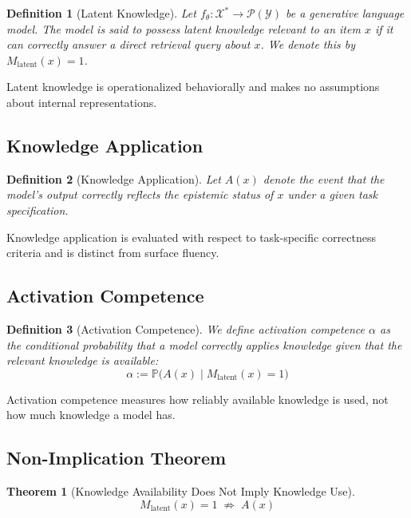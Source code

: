 \documentclass[11pt,a4paper]{article}
\newtheorem{definition}{Definition}[section]
\newtheorem{theorem}{Theorem}[section]
\begin{document}
\begin{definition}[Latent Knowledge]
Let $f_\theta : \mathcal{X}^* \rightarrow \mathcal{P}(\mathcal{Y})$ be a generative language model. The model is said to possess \emph{latent knowledge} relevant to an item $x$ if it can correctly answer a direct retrieval query about $x$. We denote this by $M_{\text{latent}}(x) = 1$.
\end{definition}

Latent knowledge is operationalized behaviorally and makes no assumptions about internal representations.

\subsection{Knowledge Application}

\begin{definition}[Knowledge Application]
Let $A(x)$ denote the event that the model's output correctly reflects the epistemic status of $x$ under a given task specification.
\end{definition}

Knowledge application is evaluated with respect to task-specific correctness criteria and is distinct from surface fluency.

\subsection{Activation Competence}

\begin{definition}[Activation Competence]
We define \emph{activation competence} $\alpha$ as the conditional probability that a model correctly applies knowledge given that the relevant knowledge is available:
\begin{equation}
\boxed{\alpha := \mathbb{P}\big(A(x) \mid M_{\text{latent}}(x) = 1\big)}
\end{equation}
\end{definition}

Activation competence measures how reliably available knowledge is used, not how much knowledge a model has.

\subsection{Non-Implication Theorem}

\begin{theorem}[Knowledge Availability Does Not Imply Knowledge Use]
\[
M_{\text{latent}}(x) = 1 \;\nRightarrow\; A(x)
\]
\end{theorem}
\end{document}
